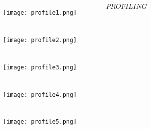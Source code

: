 \documentclass[11pt]{article}
\begin{document}
$$ PROFILING $$
\texttt{[image: profile1.png]}\\
                               \\\\
\texttt{[image: profile2.png]}\\
                               \\\\
\texttt{[image: profile3.png]}\\
                               \\\\
\texttt{[image: profile4.png]}\\
                               \\\\
\texttt{[image: profile5.png]}\\
\\\\
\end{document}
